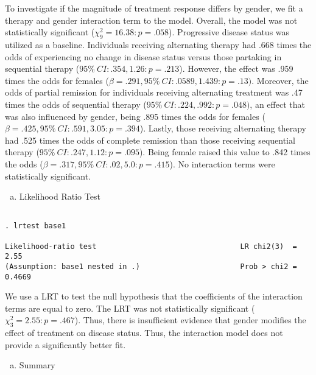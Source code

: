 \documentclass{article}
\begin{document}
To investigate if the magnitude of treatment response differs by gender, we fit a therapy and gender interaction term to the model. Overall, the model was not statistically significant ($\chi^2_9 = 16.38: p = .058$). Progressive disease status was utilized as a baseline. Individuals receiving alternating therapy had .668 times the odds of experiencing no change in disease status versus those partaking in sequential therapy ($95\%\ CI: .354, 1.26: p =.213$). However, the effect was .959 times the odds for females ($\beta = .291, 95\%\ CI: .0589, 1.439: p =.13)$. Moreover, the odds of partial remission for individuals receiving alternating treatment was .47 times the odds of sequential therapy ($95\%\ CI: .224, .992: p = .048)$, an effect that was also influenced by gender, being .895 times the odds for females ($\beta = .425, 95 \%\ CI: .591, 3.05: p=.394$). Lastly, those receiving alternating therapy had .525 times the odds of complete remission than those receiving sequential therapy ($95\%\ CI: .247, 1.12: p= .095$). Being female raised this value to .842 times the odds ($\beta = .317, 95 \%\ CI: .02, 5.0: p =.415$). No interaction terms were statistically significant.


\begin{enumerate}[d.]
\item Likelihood Ratio Test
\end{enumerate}

\begin{verbatim}
    
. lrtest base1

Likelihood-ratio test                                 LR chi2(3)  =      2.55
(Assumption: base1 nested in .)                       Prob > chi2 =    0.4669

\end{verbatim}

We use a LRT to test the null hypothesis that the coefficients of the interaction terms are equal to zero. The LRT was not statistically significant ($\chi^2_3 = 2.55: p=.467$). Thus, there is insufficient evidence that gender modifies the effect of treatment on disease status. Thus, the interaction model does not provide a significantly better fit.


\begin{enumerate}[e.]
\item Summary
\end{enumerate}
\end{document}
